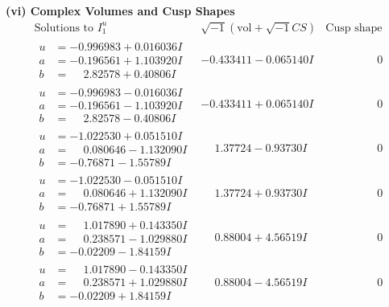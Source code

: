 \documentclass[1p]{elsarticle_modified}
\theoremstyle{definition}
\newcommand{\I}{\sqrt{-1}}
\begin{document}
\newpage\flushleft \textbf{(vi) Complex Volumes and Cusp Shapes}
$$\begin{array}{c|c|c}  
\text{Solutions to }I^u_{1}& \I (\text{vol} + \sqrt{-1}CS) & \text{Cusp shape}\\
 \hline 
\begin{aligned}
u &= -0.996983 + 0.016036 I \\
a &= -0.196561 + 1.103920 I \\
b &= \phantom{-}2.82578 + 0.40806 I\end{aligned}
 & -0.433411 - 0.065140 I & \phantom{-0.000000 } 0 \\ \hline\begin{aligned}
u &= -0.996983 - 0.016036 I \\
a &= -0.196561 - 1.103920 I \\
b &= \phantom{-}2.82578 - 0.40806 I\end{aligned}
 & -0.433411 + 0.065140 I & \phantom{-0.000000 } 0 \\ \hline\begin{aligned}
u &= -1.022530 + 0.051510 I \\
a &= \phantom{-}0.080646 - 1.132090 I \\
b &= -0.76871 - 1.55789 I\end{aligned}
 & \phantom{-}1.37724 - 0.93730 I & \phantom{-0.000000 } 0 \\ \hline\begin{aligned}
u &= -1.022530 - 0.051510 I \\
a &= \phantom{-}0.080646 + 1.132090 I \\
b &= -0.76871 + 1.55789 I\end{aligned}
 & \phantom{-}1.37724 + 0.93730 I & \phantom{-0.000000 } 0 \\ \hline\begin{aligned}
u &= \phantom{-}1.017890 + 0.143350 I \\
a &= \phantom{-}0.238571 - 1.029880 I \\
b &= -0.02209 - 1.84159 I\end{aligned}
 & \phantom{-}0.88004 + 4.56519 I & \phantom{-0.000000 } 0 \\ \hline\begin{aligned}
u &= \phantom{-}1.017890 - 0.143350 I \\
a &= \phantom{-}0.238571 + 1.029880 I \\
b &= -0.02209 + 1.84159 I\end{aligned}
 & \phantom{-}0.88004 - 4.56519 I & \phantom{-0.000000 } 0 \\ \hline\begin{aligned}

\end{aligned}
\end{array}$$
\end{document}
